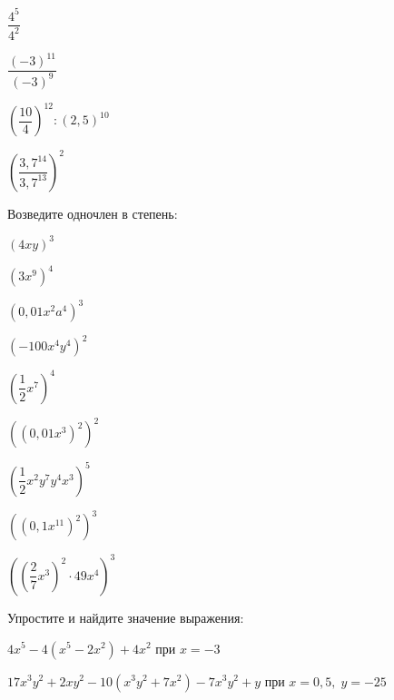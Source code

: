 \begin{listofex}
\begin{enumcols}[itemcolumns=4]
		\item \( \dfrac{4^5}{4^2} \)
		\item \( \dfrac{(-3)^{11}}{(-3)^9} \)
		\item \( \left( \dfrac{10}{4} \right)^{12}:\left( 2,5 \right)^{10} \)
		\item \( \left( \dfrac{3,7^{14}}{3,7^{13}} \right)^2 \)
	\end{enumcols}
	\item Возведите одночлен в степень:
	\begin{enumcols}[itemcolumns=4]
		\item \( (4xy)^3 \)
		\item \( (3x^9)^4 \)
		\item \( (0,01x^2a^4)^3 \)
		\item \( (-100x^4y^4)^2 \)
		\item \( \left( \dfrac{1}{2}x^7 \right)^4 \)
		\item \( \left( (0,01x^3)^2  \right)^2 \)
		\item \( \left( \dfrac{1}{2}x^2y^7y^4x^3 \right)^5 \)
		\item \( \left( \left( 0,1x^{11} \right)^2 \right)^3 \)
		\item \( \left( \left( \dfrac{2}{7}x^3 \right)^2\cdot49x^4 \right)^3 \)
	\end{enumcols}
	\item Упростите и найдите значение выражения:
	\begin{enumcols}[itemcolumns=1]
		\item \( 4x^5-4(x^5-2x^2)+4x^2 \) при \( x=-3 \)
		\item \( 17x^3y^2+2xy^2-10(x^3y^2+7x^2)-7x^3y^2+y\) при \( x=0,5,\;y=-25 \)
	\end{enumcols}
\end{listofex}